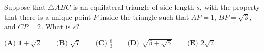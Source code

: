 Suppose that $\triangle ABC$ is an equilateral triangle of side length $s$, with the property that there is a unique point $P$ inside the triangle such that $AP = 1$, $BP = \sqrt{3}$, and $CP = 2$. What is $s?$

$\textbf{(A) } 1 + \sqrt{2} \qquad \textbf{(B) } \sqrt{7} \qquad \textbf{(C) } \frac{8}{3} \qquad \textbf{(D) } \sqrt{5 + \sqrt{5}} \qquad \textbf{(E) } 2\sqrt{2}$